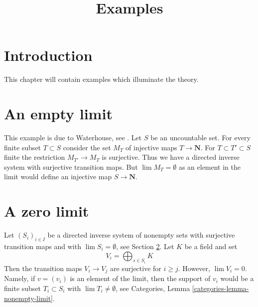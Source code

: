 

%


\title{Examples}


\maketitle

\label{section-phantom}

\tableofcontents

\section{Introduction}
\label{section-introduction}

\noindent
This chapter will contain examples which illuminate the theory.





\section{An empty limit}
\label{section-empty-limit}

\noindent
This example is due to Waterhouse, see \cite{Waterhouse}.
Let $S$ be an uncountable set. For every finite subset
$T \subset S$ consider the set $M_T$ of injective maps $T \to \mathbf{N}$.
For $T \subset T' \subset S$ finite the restriction $M_{T'} \to M_T$
is surjective. Thus we have a directed inverse system with
surjective transition maps.
But $\lim M_T = \emptyset$ as an element in the limit would
define an injective map $S \to \mathbf{N}$.



\section{A zero limit}
\label{section-zero-limit}

\noindent
Let $(S_i)_{i \in I}$ be a directed inverse system of nonempty sets
with surjective transition maps and
with $\lim S_i = \emptyset$, see Section \ref{section-empty-limit}.
Let $K$ be a field and set
$$
V_i = \bigoplus\nolimits_{s \in S_i} K
$$
Then the transition maps $V_i \to V_j$ are surjective for $i \geq j$.
However, $\lim V_i = 0$. Namely, if $v = (v_i)$ is an element of the
limit, then the support of $v_i$ would be a finite subset $T_i \subset S_i$
with $\lim T_i \not = \emptyset$, see
Categories, Lemma \ref{categories-lemma-nonempty-limit}.

